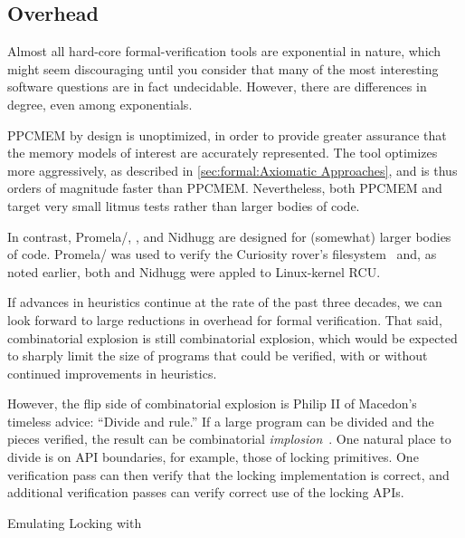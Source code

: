 \fi

\subsection{Overhead}
\label{sec:future:Overhead}

Almost all hard-core formal-verification tools are exponential
in nature, which might seem discouraging until you consider that
many of the most interesting software questions are in fact undecidable.
However, there are differences in degree, even among exponentials.

PPCMEM by design is unoptimized, in order to provide greater assurance
that the memory models of interest are accurately represented.
The  tool optimizes more aggressively, as described in
\cref{sec:formal:Axiomatic Approaches}, and is thus orders of magnitude
faster than PPCMEM\@.
Nevertheless, both PPCMEM and  target very small litmus tests
rather than larger bodies of code.

In contrast, Promela/, , and Nidhugg are designed for
(somewhat) larger bodies of code.
Promela/ was used to verify the Curiosity rover's
filesystem~\cite{DBLP:journals/amai/GroceHHJX14} and, as noted earlier,
both  and Nidhugg were appled to Linux-kernel RCU\@.

If advances in heuristics continue at the rate of the past three
decades, we can look forward to large reductions in overhead for
formal verification.
That said, combinatorial explosion is still combinatorial explosion,
which would be expected to sharply limit the size of programs that
could be verified, with or without continued improvements in
heuristics.

However, the flip side of combinatorial explosion is Philip II of
Macedon's timeless advice: ``Divide and rule.''
If a large program can be divided and the pieces verified, the result
can be combinatorial \emph{implosion}~\cite{PaulEMcKenney2011Verico}.
One natural place to divide is on API boundaries, for example, those
of locking primitives.
One verification pass can then verify that the locking implementation
is correct, and additional verification passes can verify correct
use of the locking APIs.

\begin{listing}[tbp]

\caption{Emulating Locking with }
\label{lst:future:Emulating Locking with cmpxchg}
\end{listing}

